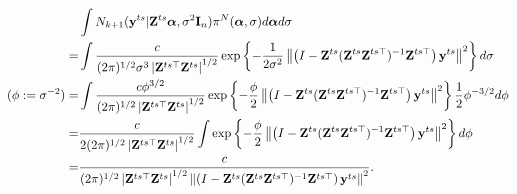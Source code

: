 \documentclass[11pt]{article}
\newcommand{\By}{\mathbf{y}}    \newcommand{\Bz}{\mathbf{z}}
\newcommand{\bfsym}[1]{\ensuremath{\boldsymbol{#1}}}
\def\balpha{\bfsym \alpha}
\theoremstyle{plain}
\theoremstyle{definition}
\theoremstyle{remark}
\begin{document}
\begin{equation*}
    \begin{split}
    &\int N_{k+1} (\By^{ts} | \BZ^{ts} \balpha, \sigma^2 \BI_n) \pi^N (\balpha, \sigma) d\balpha d \sigma
    \\
    =&
    \int
    \frac{c}{(2\pi)^{1/2} \sigma^3 \left| \BZ^{ts\top} \BZ^{ts} \right|^{1/2} } \exp\left\{-\frac{1}{2\sigma^2} \left\|\left(I-\BZ^{ts} (\BZ^{ts} \BZ^{ts\top})^{-1}\BZ^{ts\top}\right)\By^{ts}\right\|^2\right\}
     d \sigma
     \\
     (\phi:=\sigma^{-2})=&
    \int
    \frac{c \phi^{3/2}}{(2\pi)^{1/2} \left| \BZ^{ts\top} \BZ^{ts} \right|^{1/2} } \exp\left\{-\frac{\phi}{2} \left\|\left(I-\BZ^{ts} (\BZ^{ts} \BZ^{ts\top})^{-1}\BZ^{ts\top}\right)\By^{ts}\right\|^2\right\}
    \frac{1}{2} \phi^{-3/2} d \phi
     \\
     =&
    \frac{c }{2(2\pi)^{1/2} \left| \BZ^{ts\top} \BZ^{ts} \right|^{1/2} }
    \int
    \exp\left\{-\frac{\phi}{2} \left\|\left(I-\BZ^{ts} (\BZ^{ts} \BZ^{ts\top})^{-1}\BZ^{ts\top}\right)\By^{ts}\right\|^2\right\}
      d \phi
      \\
     =&
    \frac{c }{(2\pi)^{1/2} \left| \BZ^{ts\top} \BZ^{ts} \right|^{1/2} 
     \left\|\left(I-\BZ^{ts} (\BZ^{ts} \BZ^{ts\top})^{-1}\BZ^{ts\top}\right)\By^{ts}\right\|^2
 }.
    \end{split}
\end{equation*}
\end{document}
